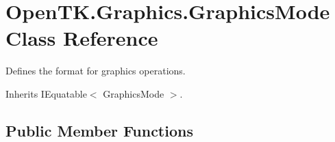 \hypertarget{class_open_t_k_1_1_graphics_1_1_graphics_mode}{\section{Open\-T\-K.\-Graphics.\-Graphics\-Mode Class Reference}
\label{class_open_t_k_1_1_graphics_1_1_graphics_mode}
}


Defines the format for graphics operations. 




Inherits I\-Equatable$<$ Graphics\-Mode $>$.

\subsection*{Public Member Functions}
